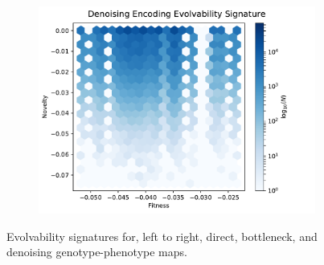 \begin{figure}
\begin{subfigure}[b]{0.33\linewidth}
                \includegraphics[width=\linewidth]{img/noise_es_unscaled}
        \end{subfigure}
        \caption{Evolvability signatures for, left to right, direct, bottleneck, and denoising genotype-phenotype maps.}\label{fig:all_es}
\end{figure}
